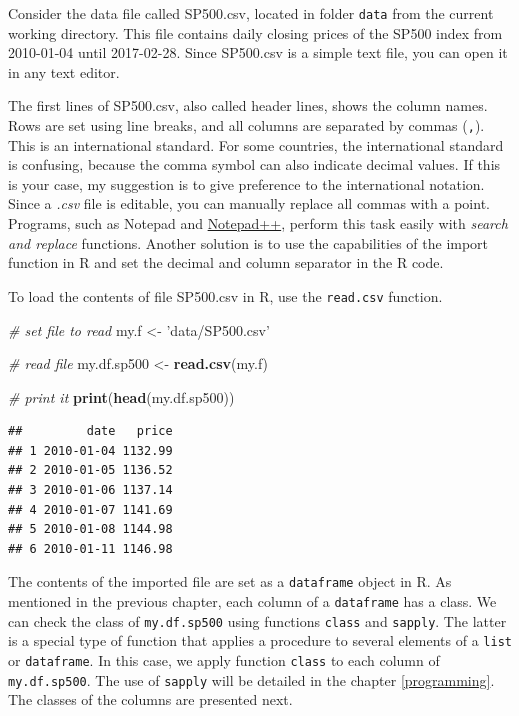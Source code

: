 \documentclass[11pt,]{book}
\newenvironment{Shaded}{\begin{snugshade}}{\end{snugshade}}
\newcommand{\KeywordTok}[1]{\textcolor[rgb]{0.27,0.27,0.27}{\textbf{#1}}}
\newcommand{\StringTok}[1]{\textcolor[rgb]{0.5,0.5,0.5}{#1}}
\newcommand{\CommentTok}[1]{\textcolor[rgb]{0.56,0.35,0.01}{\textit{#1}}}
\newcommand{\NormalTok}[1]{#1}
\begin{document}
Consider the data file called SP500.csv, located in folder \texttt{data}
from the current working directory. This file contains daily closing
prices of the SP500 index from 2010-01-04 until 2017-02-28. Since
SP500.csv is a simple text file, you can open it in any text editor.

The first lines of SP500.csv, also called header lines, shows the column
names. Rows are set using line breaks, and all columns are separated by
commas (\texttt{,}). This is an international standard. For some
countries, the international standard is confusing, because the comma
symbol can also indicate decimal values. If this is your case, my
suggestion is to give preference to the international notation. Since a
\emph{.csv} file is editable, you can manually replace all commas with a
point. Programs, such as Notepad and
\href{https://notepad-plus-plus.org/}{Notepad++}, perform this task
easily with \emph{search and replace} functions. Another solution is to
use the capabilities of the import function in R and set the decimal and
column separator in the R code.

To load the contents of file SP500.csv in R, use the \texttt{read.csv}
function. 

\begin{Shaded}
\begin{Highlighting}[]
\CommentTok{# set file to read}
\NormalTok{my.f <-}\StringTok{ 'data/SP500.csv'}

\CommentTok{# read file}
\NormalTok{my.df.sp500 <-}\StringTok{ }\KeywordTok{read.csv}\NormalTok{(my.f)}

\CommentTok{# print it}
\KeywordTok{print}\NormalTok{(}\KeywordTok{head}\NormalTok{(my.df.sp500))}
\end{Highlighting}
\end{Shaded}

\begin{verbatim}
##         date   price
## 1 2010-01-04 1132.99
## 2 2010-01-05 1136.52
## 3 2010-01-06 1137.14
## 4 2010-01-07 1141.69
## 5 2010-01-08 1144.98
## 6 2010-01-11 1146.98
\end{verbatim}

The contents of the imported file are set as a \texttt{dataframe} object
in R. As mentioned in the previous chapter, each column of a
\texttt{dataframe} has a class. We can check the class of
\texttt{my.df.sp500} using functions \texttt{class} and \texttt{sapply}.
The latter is a special type of function that applies a procedure to
several elements of a \texttt{list} or \texttt{dataframe}. In this case,
we apply function \texttt{class} to each column of \texttt{my.df.sp500}.
The use of \texttt{sapply} will be detailed in the chapter
\ref{programming}. The classes of the columns are presented next.
 
\end{document}
